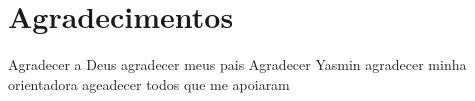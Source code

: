 

\chapter*{Agradecimentos}

\noindent

Agradecer a Deus 
agradecer meus pais
Agradecer Yasmin 
agradecer minha orientadora
ageadecer todos que me apoiaram
